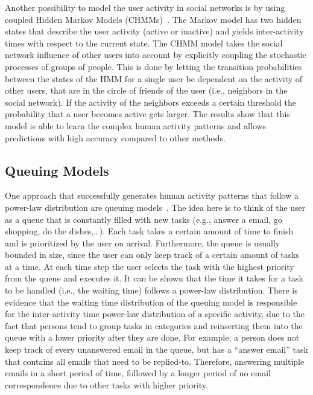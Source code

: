 Another possibility to model the user activity in social networks is by using coupled Hidden Markov Models (CHMMs)~\cite{Raghavan2013}.
The Markov model has two hidden states that describe the user activity (active or inactive) and yields inter-activity times with respect to the current state.
The CHMM model takes the social network influence of other users into account by explicitly coupling the stochastic processes of groups of people.
This is done by letting the transition probabilities between the states of the HMM for a single user be dependent on the activity of other users, that are in the circle of friends of the user (i.e., neighbors in the social network).
If the activity of the neighbors exceeds a certain threshold the probability that a user becomes active gets larger.
The results show that this model is able to learn the complex human activity patterns and allows predictions with high accuracy compared to other methods.

\subsection{Queuing Models}

One approach that successfully generates human activity patterns that follow a power-law distribution are queuing models~\cite{Vazquez2006}.
The idea here is to think of the user as a queue that is constantly filled with new tasks (e.g., answer a email, go shopping, do the dishes,\ldots).
Each task takes a certain amount of time to finish and is prioritized by the user on arrival.
Furthermore, the queue is usually bounded in size, since the user can only keep track of a certain amount of tasks at a time.
At each time step the user selects the task with the highest priority from the queue and executes it.
It can be shown that the time it takes for a task to be handled (i.e., the waiting time) follows a power-law distribution.
There is evidence that the waiting time distribution of the queuing model is responsible for the inter-activity time power-law distribution of a specific activity, due to the fact that persons tend to group tasks in categories and reinserting them into the queue with a lower priority after they are done.
For example, a person does not keep track of every unanswered email in the queue, but has a \enquote{answer email} task that contains all emails that need to be replied-to.
Therefore, answering multiple emails in a short period of time, followed by a longer period of no email correspondence due to other tasks with higher priority.

